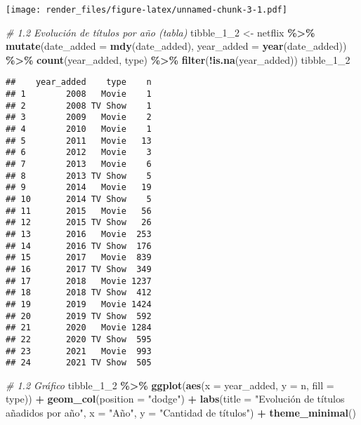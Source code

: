 \documentclass[
]{article}
\newenvironment{Shaded}{\begin{snugshade}}{\end{snugshade}}
\newcommand{\AttributeTok}[1]{\textcolor[rgb]{0.13,0.29,0.53}{#1}}
\newcommand{\CommentTok}[1]{\textcolor[rgb]{0.56,0.35,0.01}{\textit{#1}}}
\newcommand{\FunctionTok}[1]{\textcolor[rgb]{0.13,0.29,0.53}{\textbf{#1}}}
\newcommand{\NormalTok}[1]{#1}
\newcommand{\OtherTok}[1]{\textcolor[rgb]{0.56,0.35,0.01}{#1}}
\newcommand{\SpecialCharTok}[1]{\textcolor[rgb]{0.81,0.36,0.00}{\textbf{#1}}}
\newcommand{\StringTok}[1]{\textcolor[rgb]{0.31,0.60,0.02}{#1}}
\begin{document}
\texttt{[image: render\_files/figure-latex/unnamed-chunk-3-1.pdf]}

\begin{Shaded}
\begin{Highlighting}[]
\CommentTok{\# 1.2 Evolución de títulos por año (tabla)}
\NormalTok{tibble\_1\_2 }\OtherTok{\textless{}{-}}\NormalTok{ netflix }\SpecialCharTok{\%\textgreater{}\%}
  \FunctionTok{mutate}\NormalTok{(}\AttributeTok{date\_added =} \FunctionTok{mdy}\NormalTok{(date\_added),}
         \AttributeTok{year\_added =} \FunctionTok{year}\NormalTok{(date\_added)) }\SpecialCharTok{\%\textgreater{}\%}
  \FunctionTok{count}\NormalTok{(year\_added, type) }\SpecialCharTok{\%\textgreater{}\%}
  \FunctionTok{filter}\NormalTok{(}\SpecialCharTok{!}\FunctionTok{is.na}\NormalTok{(year\_added))}
\NormalTok{tibble\_1\_2}
\end{Highlighting}
\end{Shaded}

\begin{verbatim}
##    year_added    type    n
## 1        2008   Movie    1
## 2        2008 TV Show    1
## 3        2009   Movie    2
## 4        2010   Movie    1
## 5        2011   Movie   13
## 6        2012   Movie    3
## 7        2013   Movie    6
## 8        2013 TV Show    5
## 9        2014   Movie   19
## 10       2014 TV Show    5
## 11       2015   Movie   56
## 12       2015 TV Show   26
## 13       2016   Movie  253
## 14       2016 TV Show  176
## 15       2017   Movie  839
## 16       2017 TV Show  349
## 17       2018   Movie 1237
## 18       2018 TV Show  412
## 19       2019   Movie 1424
## 20       2019 TV Show  592
## 21       2020   Movie 1284
## 22       2020 TV Show  595
## 23       2021   Movie  993
## 24       2021 TV Show  505
\end{verbatim}

\begin{Shaded}
\begin{Highlighting}[]
\CommentTok{\# 1.2 Gráfico}
\NormalTok{tibble\_1\_2 }\SpecialCharTok{\%\textgreater{}\%}
  \FunctionTok{ggplot}\NormalTok{(}\FunctionTok{aes}\NormalTok{(}\AttributeTok{x =}\NormalTok{ year\_added, }\AttributeTok{y =}\NormalTok{ n, }\AttributeTok{fill =}\NormalTok{ type)) }\SpecialCharTok{+}
  \FunctionTok{geom\_col}\NormalTok{(}\AttributeTok{position =} \StringTok{"dodge"}\NormalTok{) }\SpecialCharTok{+}
  \FunctionTok{labs}\NormalTok{(}\AttributeTok{title =} \StringTok{"Evolución de títulos añadidos por año"}\NormalTok{,}
       \AttributeTok{x =} \StringTok{"Año"}\NormalTok{, }\AttributeTok{y =} \StringTok{"Cantidad de títulos"}\NormalTok{) }\SpecialCharTok{+}
  \FunctionTok{theme\_minimal}\NormalTok{()}
\end{Highlighting}
\end{Shaded}
\end{document}
